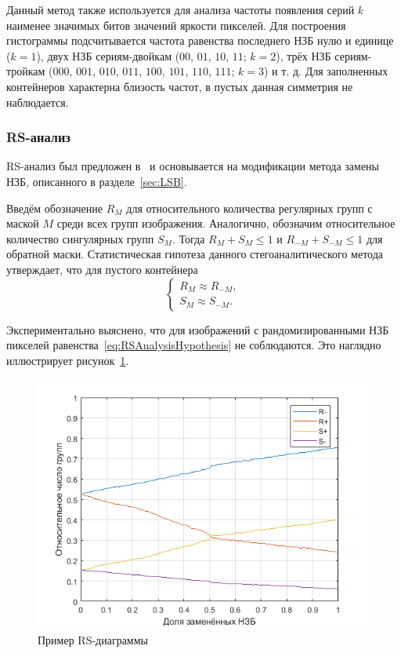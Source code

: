 Данный метод также используется для анализа частоты появления серий $ k $ наименее значимых битов значений яркости пикселей. Для построения гистограммы подсчитывается частота равенства последнего НЗБ нулю и единице ($ k = 1 $), двух НЗБ сериям-двойкам ($ 00 $, $ 01 $, $ 10 $, $ 11 $; $ k = 2 $), трёх НЗБ сериям-тройкам ($ 000 $, $ 001 $, $ 010 $, $ 011 $, $ 100 $, $ 101 $, $ 110 $, $ 111 $; $ k = 3 $) и т. д. Для заполненных контейнеров характерна близость частот, в пустых данная симметрия не наблюдается.

\subsubsection {RS-анализ}

RS-анализ был предложен в~\cite{FridrichRSAnalysis} и основывается на модификации метода замены НЗБ, описанного в разделе~\ref{sec:LSB}.

Введём обозначение $ R_M $ для относительного количества регулярных групп с маской $ M $ среди всех групп изображения. Аналогично, обозначим относительное количество сингулярных групп $ S_M $. Тогда $ R_M + S_M \leq 1$ и $ R_{-M} + S_{-M} \leq 1$ для обратной маски. Статистическая гипотеза данного стегоаналитического метода утверждает, что для пустого контейнера
\begin{equation}
\label{eq:RSAnalysisHypothesis}
\begin{cases}
R_M \approx R_{-M}, \\
S_M \approx S_{-M}.
\end{cases}
\end{equation}

Экспериментально выяснено, что для изображений с рандомизированными НЗБ пикселей равенства~\ref{eq:RSAnalysisHypothesis} не соблюдаются. Это наглядно иллюстрирует рисунок~\ref{fig:RSDiagram}.

\begin{figure}[h]
     \centering
     \includegraphics[width=1\textwidth]{include/graphics/rs_diagram}
     \caption{Пример RS-диаграммы}
     \label{fig:RSDiagram}
\end{figure}


